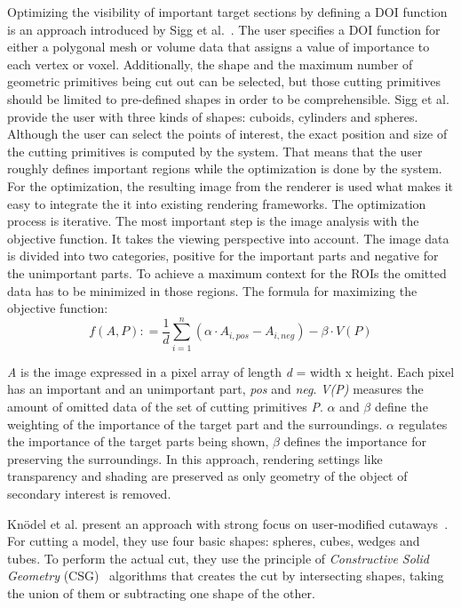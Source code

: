 Optimizing the visibility of important target sections by defining a DOI function is an approach introduced by Sigg et al.~\cite{proc:intelligentCutaway}. The user specifies a DOI function for either a polygonal mesh or volume data that assigns a value of importance to each vertex or voxel. Additionally, the shape and the maximum number of geometric primitives being cut out can be selected, but those cutting primitives should be limited to pre-defined shapes in order to be comprehensible. Sigg et al. provide the user with three kinds of shapes: cuboids, cylinders and spheres. Although the user can select the points of interest, the exact position and size of the cutting primitives is computed by the system. That means that the user roughly defines important regions while the optimization is done by the system. For the optimization, the resulting image from the renderer is used what makes it easy to integrate the it into existing rendering frameworks. The optimization process is iterative. The most important step is the image analysis with the objective function. It takes the viewing perspective into account. The image data is divided into two categories, positive for the important parts and negative for the unimportant parts. To achieve a maximum context for the ROIs the omitted data has to be minimized in those regions. The formula for maximizing the objective function:
\begin{equation}
f(A, P) \colon= \frac{1}{d} \sum^n_{i=1} (\alpha\cdot A_{i,pos} - A_{i,neg}) - \beta\cdot V(P)
\label{eq:objectiveFunction}
\end{equation}

\emph{A} is the image expressed in a pixel array of length \emph{d} = width x height. Each pixel has an important and an unimportant part, \emph{pos} and \emph{neg}. \emph{V(P)} measures the amount of omitted data of the set of cutting primitives \emph{P}. $\alpha$ and $\beta$ define the weighting of the importance of the target part and the surroundings. $\alpha$ regulates the importance of the target parts being shown, $\beta$ defines the importance for preserving the surroundings. In this approach, rendering settings like transparency and shading are preserved as only geometry of the object of secondary interest is removed.

Kn{\"o}del et al. present an approach with strong focus on user-modified cutaways~\cite{incoll:cutawayIllustration}. For cutting a model, they use four basic shapes: spheres, cubes, wedges and tubes. To perform the actual cut, they use the principle of \emph{Constructive Solid Geometry} (CSG)~\cite{book:computerGraphicsHearn}\cite{book:computerGraphicsHill} algorithms that creates the cut by intersecting shapes, taking the union of them or subtracting one shape of the other.

